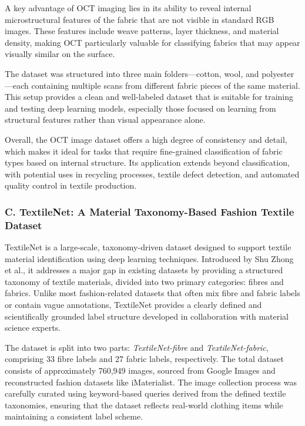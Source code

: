 A key advantage of OCT imaging lies in its ability to reveal internal microstructural features of the fabric that are not visible in standard RGB images. These features include weave patterns, layer thickness, and material density, making OCT particularly valuable for classifying fabrics that may appear visually similar on the surface.

The dataset was structured into three main folders—cotton, wool, and polyester—each containing multiple scans from different fabric pieces of the same material. This setup provides a clean and well-labeled dataset that is suitable for training and testing deep learning models, especially those focused on learning from structural features rather than visual appearance alone.

Overall, the OCT image dataset offers a high degree of consistency and detail, which makes it ideal for tasks that require fine-grained classification of fabric types based on internal structure. Its application extends beyond classification, with potential uses in recycling processes, textile defect detection, and automated quality control in textile production.

\subsubsection{C. TextileNet: A Material Taxonomy-Based Fashion Textile Dataset~\cite{zhong2023textilenet}}

TextileNet is a large-scale, taxonomy-driven dataset designed to support textile material identification using deep learning techniques. Introduced by Shu Zhong et al., it addresses a major gap in existing datasets by providing a structured taxonomy of textile materials, divided into two primary categories: fibres and fabrics. Unlike most fashion-related datasets that often mix fibre and fabric labels or contain vague annotations, TextileNet provides a clearly defined and scientifically grounded label structure developed in collaboration with material science experts.

The dataset is split into two parts: \textit{TextileNet-fibre} and \textit{TextileNet-fabric}, comprising 33 fibre labels and 27 fabric labels, respectively. The total dataset consists of approximately 760,949 images, sourced from Google Images and reconstructed fashion datasets like iMaterialist. The image collection process was carefully curated using keyword-based queries derived from the defined textile taxonomies, ensuring that the dataset reflects real-world clothing items while maintaining a consistent label scheme.

